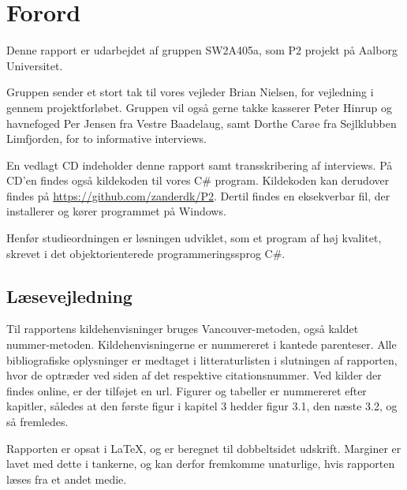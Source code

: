 \chapter*{Forord}
Denne rapport er udarbejdet af gruppen SW2A405a, som P2 projekt på Aalborg Universitet.

Gruppen sender et stort tak til vores vejleder Brian Nielsen, for vejledning i gennem projektforløbet. Gruppen vil også gerne takke kasserer Peter Hinrup og havnefoged Per Jensen fra Vestre Baadelaug, samt Dorthe Carøe fra Sejlklubben Limfjorden, for to informative interviews.

En vedlagt CD indeholder denne rapport samt transskribering af interviews. På CD'en findes også kildekoden til vores C\# program. Kildekoden kan derudover findes på \url{https://github.com/zanderdk/P2}. Dertil findes en eksekverbar fil, der installerer og kører programmet på Windows.

Henfør studieordningen er løsningen udviklet, som et program af høj kvalitet, skrevet i det objektorienterede programmeringssprog C\#.

\section*{Læsevejledning}
Til rapportens kildehenvisninger bruges Vancouver-metoden, også kaldet nummer-metoden. Kildehenvisningerne er nummereret i kantede parenteser. Alle bibliografiske oplysninger er medtaget i litteraturlisten i slutningen af rapporten, hvor de optræder ved siden af det respektive citationsnummer. Ved kilder der findes online, er der tilføjet en url. Figurer og tabeller er nummereret efter kapitler, således at den første figur i kapitel 3 hedder figur 3.1, den næste 3.2, og så fremledes.

Rapporten er opsat i \LaTeX{}, og er beregnet til dobbeltsidet udskrift. Marginer er lavet med dette i tankerne, og kan derfor fremkomme unaturlige, hvis rapporten læses fra et andet medie.
